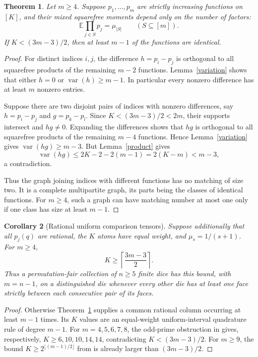 \documentclass[11pt]{article}
\newtheorem{theorem}{Theorem}
\newtheorem{corollary}[theorem]{Corollary}
\newcommand{\E}{\mathbb E}
\newcommand{\V}{\operatorname{var}}
\begin{document}
\begin{theorem}\label{structure}
Let $m\ge4$. Suppose $p_1,\ldots,p_m$ are strictly increasing functions
on $[K]$, and their mixed squarefree moments depend only on the number
of factors:
\[
 \E\prod_{j\in S}p_j=\mu_{|S|}
 \qquad(S\subseteq[m]).
\]
If $K<(3m-3)/2$, then at least $m-1$ of the functions are identical.
\end{theorem}
\begin{proof}
For distinct indices $i,j$, the difference $h=p_i-p_j$ is orthogonal
to all squarefree products of the remaining $m-2$ functions.
Lemma~\ref{variation} shows that either $h=0$ or $\V(h)\ge m-1$.
In particular every nonzero difference has at least $m$ nonzero entries.

Suppose there are two disjoint pairs of indices with nonzero differences,
say $h=p_i-p_j$ and $g=p_k-p_l$.
Since $K<(3m-3)/2<2m$, their supports intersect and $hg\ne0$.
Expanding the differences shows that $hg$ is orthogonal to all
squarefree products of the remaining $m-4$ functions. Hence
Lemma~\ref{variation} gives $\V(hg)\ge m-3$.
But Lemma~\ref{product} gives
\[
 \V(hg)\le2K-2-2(m-1)=2(K-m)<m-3,
\]
a contradiction.

Thus the graph joining indices with different functions has no matching
of size two. It is a complete multipartite graph, its parts being the
classes of identical functions. For $m\ge4$, such a graph can have
matching number at most one only if one class has size at least $m-1$.
\end{proof}

\begin{corollary}[Rational uniform comparison tensors]\label{rational}
Suppose additionally that all $p_j(q)$ are rational, the $K$ atoms have
equal weight, and $\mu_s=1/(s+1)$.
For $m\ge4$,
\[
 K\ge\left\lceil\frac{3m-3}{2}\right\rceil.
\]
Thus a permutation-fair collection of $n\ge5$ finite dice has this
bound, with $m=n-1$, on a distinguished die whenever every other die
has at least one face strictly between each consecutive pair of its
faces.
\end{corollary}
\begin{proof}
Otherwise Theorem~\ref{structure} supplies a common rational column
occurring at least $m-1$ times. Its $K$ values are an equal-weight
uniform-interval quadrature rule of degree $m-1$.
For $m=4,5,6,7,8$, the odd-prime obstruction in
 gives, respectively,
$K\ge6,10,10,14,14$, contradicting $K<(3m-3)/2$.
For $m\ge9$, the bound $K\ge2^{\lfloor(m-1)/2\rfloor}$ from
 is already larger
than $(3m-3)/2$.
\end{proof}
\end{document}
